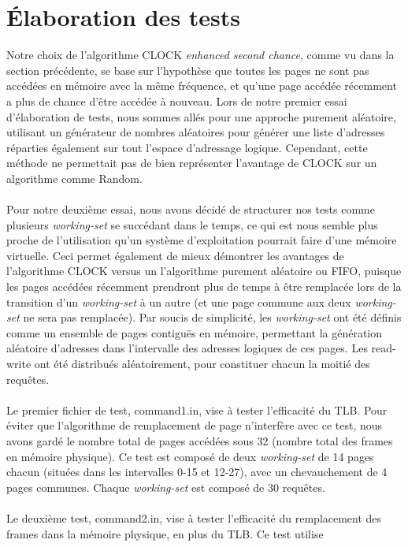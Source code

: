 \documentclass{article}
\begin{document}
\section{Élaboration des tests}
\setlength{\parindent}{20pt}
Notre choix de l’algorithme CLOCK \emph{enhanced second chance}, comme vu dans la section précédente, se base sur l’hypothèse que toutes les 
pages ne sont pas accédées en mémoire avec la même fréquence, et qu’une page accédée récemment a plus de chance d’être accédée à nouveau. 
Lors de notre premier essai d’élaboration de tests, nous sommes allés pour une approche purement aléatoire, utilisant un générateur de nombres 
aléatoires pour générer une liste d’adresses réparties également sur tout l’espace d’adressage logique. Cependant, cette méthode ne permettait  
pas de bien représenter l’avantage de CLOCK sur un algorithme comme Random.\\
\\
Pour notre deuxième essai, nous avons décidé de structurer nos tests comme plusieurs \emph{working-set} se succédant dans le temps, ce qui est 
nous semble plus proche de l’utilisation qu’un système d’exploitation pourrait faire d’une mémoire virtuelle. Ceci permet également de mieux 
démontrer les avantages de l’algorithme CLOCK versus un l’algorithme purement aléatoire ou FIFO, puisque les pages accédées récemment prendront 
plus de temps à être remplacée lors de la transition d’un \emph{working-set} à un autre (et une page commune aux deux \emph{working-set} ne sera 
pas remplacée). Par soucis de simplicité, les \emph{working-set} ont été définis comme un ensemble de pages contiguës en mémoire, permettant la 
génération aléatoire d’adresses dans l’intervalle des adresses logiques de ces pages. Les read-write ont été distribués aléatoirement, pour 
constituer chacun la moitié des requêtes.\\    
\\
Le premier fichier de test, command1.in, vise à tester l’efficacité du TLB. Pour éviter que l’algorithme de remplacement de page n’interfère 
avec ce test, nous avons gardé le nombre total de pages accédées sous 32 (nombre total des frames en mémoire physique). Ce test est composé de 
deux \emph{working-set} de 14 pages chacun (situées dans les intervalles 0-15 et 12-27), avec un chevauchement de 4 pages communes. Chaque 
\emph{working-set} est composé de 30 requêtes.\\ 
\\
Le deuxième test, command2.in, vise à tester l’efficacité du remplacement des frames dans la mémoire physique, en plus du TLB. Ce test utilise 
\end{document}
